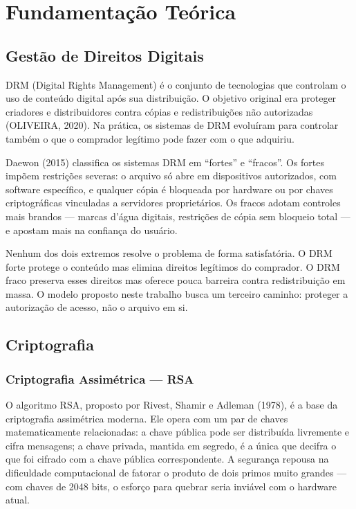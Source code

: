 \documentclass[12pt]{article}
\begin{document}
\section{Fundamentação Teórica}

\subsection{Gestão de Direitos Digitais}

DRM (Digital Rights Management) é o conjunto de tecnologias que controlam o uso de conteúdo digital após sua distribuição. O objetivo original era proteger criadores e distribuidores contra cópias e redistribuições não autorizadas (OLIVEIRA, 2020). Na prática, os sistemas de DRM evoluíram para controlar também o que o comprador legítimo pode fazer com o que adquiriu.

Daewon (2015) classifica os sistemas DRM em ``fortes'' e ``fracos''. Os fortes impõem restrições severas: o arquivo só abre em dispositivos autorizados, com software específico, e qualquer cópia é bloqueada por hardware ou por chaves criptográficas vinculadas a servidores proprietários. Os fracos adotam controles mais brandos — marcas d'água digitais, restrições de cópia sem bloqueio total — e apostam mais na confiança do usuário.

Nenhum dos dois extremos resolve o problema de forma satisfatória. O DRM forte protege o conteúdo mas elimina direitos legítimos do comprador. O DRM fraco preserva esses direitos mas oferece pouca barreira contra redistribuição em massa. O modelo proposto neste trabalho busca um terceiro caminho: proteger a autorização de acesso, não o arquivo em si.

\subsection{Criptografia}

\subsubsection*{Criptografia Assimétrica — RSA}

O algoritmo RSA, proposto por Rivest, Shamir e Adleman (1978), é a base da criptografia assimétrica moderna. Ele opera com um par de chaves matematicamente relacionadas: a chave pública pode ser distribuída livremente e cifra mensagens; a chave privada, mantida em segredo, é a única que decifra o que foi cifrado com a chave pública correspondente. A segurança repousa na dificuldade computacional de fatorar o produto de dois primos muito grandes — com chaves de 2048 bits, o esforço para quebrar seria inviável com o hardware atual.
\end{document}
